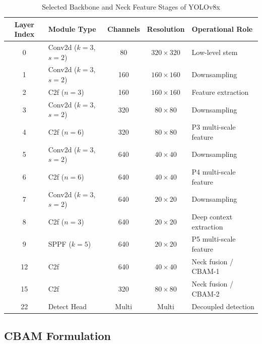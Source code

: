 \documentclass[conference]{IEEEtran}
\begin{document}
\begin{table}[!t]
\caption{Selected Backbone and Neck Feature Stages of YOLOv8x}
\label{tab:stages}
\centering
\renewcommand{\arraystretch}{1.1}
\begin{tabular}{|c|l|c|c|l|}
\hline
\textbf{Layer Index} & \textbf{Module Type} & \textbf{Channels} & \textbf{Resolution} & \textbf{Operational Role} \\
\hline
0  & Conv2d ($k=3$, $s=2$) & 80  & $320\times320$ & Low-level stem \\
1  & Conv2d ($k=3$, $s=2$) & 160 & $160\times160$ & Downsampling \\
2  & C2f ($n=3$)           & 160 & $160\times160$ & Feature extraction \\
3  & Conv2d ($k=3$, $s=2$) & 320 & $80\times80$   & Downsampling \\
4  & C2f ($n=6$)           & 320 & $80\times80$   & P3 multi-scale feature \\
5  & Conv2d ($k=3$, $s=2$) & 640 & $40\times40$   & Downsampling \\
6  & C2f ($n=6$)           & 640 & $40\times40$   & P4 multi-scale feature \\
7  & Conv2d ($k=3$, $s=2$) & 640 & $20\times20$   & Downsampling \\
8  & C2f ($n=3$)           & 640 & $20\times20$   & Deep context extraction \\
9  & SPPF ($k=5$)          & 640 & $20\times20$   & P5 multi-scale feature \\
12 & C2f                   & 640 & $40\times40$   & Neck fusion / CBAM-1 \\
15 & C2f                   & 320 & $80\times80$   & Neck fusion / CBAM-2 \\
22 & Detect Head           & Multi & Multi        & Decoupled detection \\
\hline
\end{tabular}
\end{table}

\subsection{CBAM Formulation}
\end{document}
